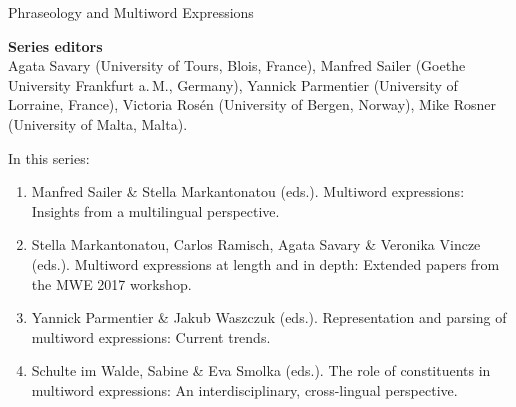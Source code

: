 {\large Phraseology and Multiword Expressions}

\bigskip

\textbf{Series editors}\\
    Agata Savary (University of Tours, Blois, France),
    Manfred Sailer (Goethe University Frankfurt a.\,M., Germany),
    Yannick Parmentier (University of Lorraine, France),
    Victoria Rosén (University of Bergen, Norway),
    Mike Rosner (University of Malta, Malta).

  \bigskip

In this series:

\begin{enumerate}
\item Manfred Sailer \& Stella Markantonatou (eds.). Multiword expressions: Insights from a multilingual perspective.
\item Stella Markantonatou, Carlos Ramisch, Agata Savary \& Veronika Vincze (eds.).  Multiword expressions at length and in depth: Extended papers from the MWE 2017 workshop.
\item Yannick Parmentier \& Jakub Waszczuk (eds.). Representation and parsing of multiword expressions: Current trends.   
\item Schulte im Walde, Sabine \&    Eva Smolka (eds.).  The role of constituents in multiword expressions: An interdisciplinary, cross-lingual perspective.

\end{enumerate}


